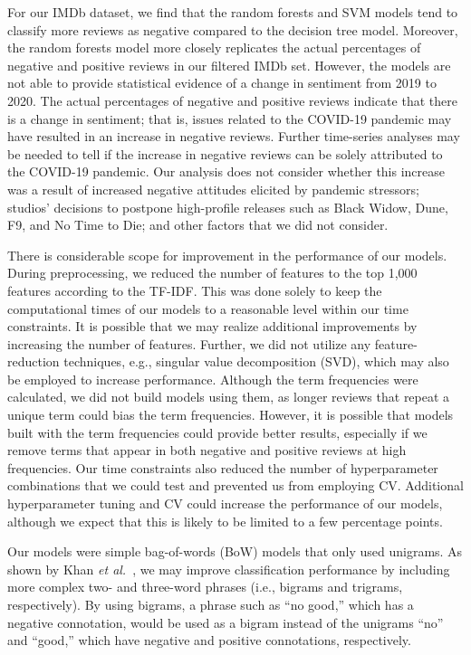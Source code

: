 \documentclass[conference]{IEEEtran}
\begin{document}
For our IMDb dataset, we find that the random forests and SVM models tend to classify more reviews as negative compared to the decision tree model. Moreover, the random forests model more closely replicates the actual percentages of negative and positive reviews in our filtered IMDb set. However, the models are not able to provide statistical evidence of a change in sentiment from 2019 to 2020. The actual percentages of negative and positive reviews indicate that there is a change in sentiment; that is, issues related to the COVID-19 pandemic may have resulted in an increase in negative reviews. Further time-series analyses may be needed to tell if the increase in negative reviews can be solely attributed to the COVID-19 pandemic. Our analysis does not consider whether this increase was a result of increased negative attitudes elicited by pandemic stressors; studios' decisions to postpone high-profile releases such as Black Widow, Dune, F9, and No Time to Die; and other factors that we did not consider.

There is considerable scope for improvement in the performance of our models. During preprocessing, we reduced the number of features to the top 1,000 features according to the TF-IDF. This was done solely to keep the computational times of our models to a reasonable level within our time constraints. It is possible that we may realize additional improvements by increasing the number of features. Further, we did not utilize any feature-reduction techniques, e.g., singular value decomposition (SVD), which may also be employed to increase performance. Although the term frequencies were calculated, we did not build models using them, as longer reviews that repeat a unique term could bias the term frequencies. However, it is possible that models built with the term frequencies could provide better results, especially if we remove terms that appear in both negative and positive reviews at high frequencies. Our time constraints also reduced the number of hyperparameter combinations that we could test and prevented us from employing CV. Additional hyperparameter tuning and CV could increase the performance of our models, although we expect that this is likely to be limited to a few percentage points.

Our models were simple bag-of-words (BoW) models that only used unigrams. As shown by Khan \emph{et al.}~\cite{ref:Khan}, we may improve classification performance by including more complex two- and three-word phrases (i.e., bigrams and trigrams, respectively). By using bigrams, a phrase such as ``no good,'' which has a negative connotation, would be used as a bigram instead of the unigrams ``no'' and ``good,'' which have negative and positive connotations, respectively.
\end{document}
